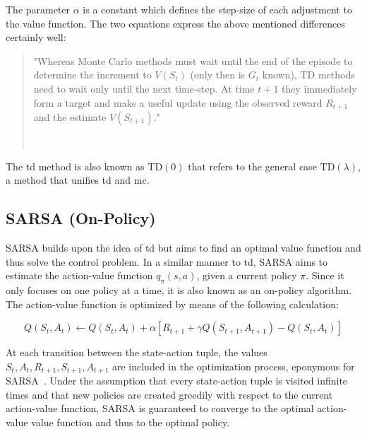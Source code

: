 \documentclass[draft,final]{vutinfth} %
\newcommand{\p}[1]{see p. #1}
\begin{document}
    The parameter $\alpha$ is a constant which defines the step-size of each adjustment to the value function.
    The two equations express the above mentioned differences certainly well:

    \begin{quote}
        "Whereas Monte Carlo methods must wait until the end of the episode to determine the increment to $V(S_t)$ (only then is $G_t$ known), TD methods need to wait only until the next time-step.
        At time $t + 1$ they immediately form a target and make a useful update using the observed reward $R_{t+1}$ and the estimate $V(S_{t+1})$."

        \hfill~\cite[\p{120}]{sutton_reinforcement_2018}
    \end{quote}

    The \gls{td} method is also known as $\text{TD}(0)$ that refers to the general case $\text{TD}(\lambda)$, a method that unifies \gls{td} and \gls{mc}.

    \subsection{SARSA (On-Policy)}\label{subsec:sarsanullon-policynull}

    SARSA builds upon the idea of \gls{td} but aims to find an optimal value function and thus solve the control problem.
    In a similar manner to \gls{td}, SARSA aims to estimate the action-value function $q_\pi(s,a)$, given a current policy $\pi$.
    Since it only focuses on one policy at a time, it is also known as an on-policy algorithm.
    The action-value function is optimized by means of the following calculation:

    \begin{equation}
        Q(S_t,A_t) \leftarrow Q(S_t,A_t) + \alpha [R_{t+1} + \gamma Q(S_{t+1},A_{t+1}) - Q(S_{t},A_{t}) ]
    \end{equation}

    At each transition between the state-action tuple, the values $S_{t},A_{t},R_{t+1},S_{t+1},A_{t+1}$ are included in the optimization process, eponymous for SARSA~\citep{sutton_reinforcement_2018}.
    Under the assumption that every state-action tuple is visited infinite times and that new policies are created greedily with respect to the current action-value function, SARSA is guaranteed to converge to the optimal action-value value function and thus to the optimal policy.
\end{document}

